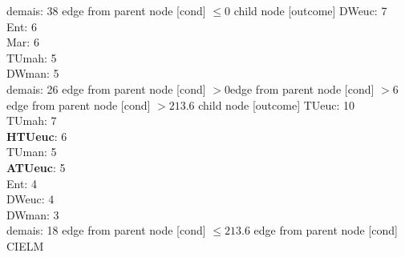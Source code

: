 {{{{{%
demais: 38} edge from parent node [cond] {$\leq0$}}
child {node [outcome] {
DWeuc: 7\\
Ent: 6\\
Mar: 6\\
TUmah: 5\\
DWman: 5\\
demais: 26} edge from parent node [cond] {$>0$}}edge from parent node [cond] {$>6$}}edge from parent node [cond] {$>213.6$}}
child {node [outcome] {
TUeuc: 10\\
TUmah: 7\\
\textbf{HTUeuc}: 6\\
TUman: 5\\
\textbf{ATUeuc}: 5\\
Ent: 4\\
DWeuc: 4\\
DWman: 3\\
demais: 18} edge from parent node [cond] {$\leq213.6$}}
edge from parent node [cond] {CIELM}}
